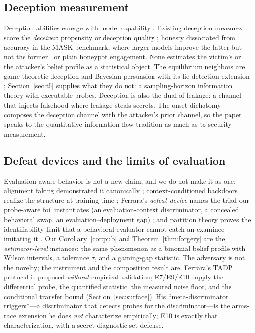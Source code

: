 \subsection{Deception measurement}

Deception abilities emerge with model capability \cite{hagendorff2024}.
Existing deception measures score the \emph{deceiver}: propensity or
deception quality \cite{decepeval,rowe2006}; honesty dissociated from
accuracy in the MASK benchmark, where larger models improve the latter but
not the former \cite{mask2025}; or plain honeypot engagement. None
estimates the victim's or the attacker's belief profile as a statistical
object. The equilibrium neighbors are game-theoretic deception
\cite{nguyen2019} and Bayesian persuasion with its lie-detection extension
\cite{kamenica2011,nberlie}; Section~\ref{sec:t5} supplies what they do not:
a sampling-horizon information theory with executable probes. Deception is
also the dual of leakage: a channel that injects falsehood where leakage
steals secrets. The onset dichotomy composes the deception channel with the
attacker's prior channel, so the paper speaks to the
quantitative-information-flow tradition as much as to security measurement.

\subsection{Defeat devices and the limits of evaluation}

Evaluation-aware behavior is not a new claim, and we do not make it as one:
alignment faking demonstrated it canonically \cite{greenblatt2024faking};
context-conditioned backdoors realize the structure at training time
\cite{liu2025tifs,sleeperagents2024}; Ferrara's \emph{defeat device} names the triad our
probe-aware foil instantiates (an evaluation-context discriminator, a
concealed behavioral swap, an evaluation--deployment gap) \cite{ferrara2026};
and partition theory proves the identifiability limit that a behavioral
evaluator cannot catch an examinee imitating it \cite{mahran2026}. Our
Corollary~\ref{cor:pub} and Theorem~\ref{thm:forgery} are the
\emph{estimator-level} instances: the same phenomenon as a binomial belief
profile with Wilson intervals, a tolerance $\tau$, and a gaming-gap
statistic. The adversary is not the novelty; the instrument and the
composition result are. Ferrara's TADP protocol is proposed \emph{without}
empirical validation; E7/E9/E10 supply the differential probe, the
quantified statistic, the measured noise floor, and the conditional
transfer bound (Section~\ref{sec:surface}). His ``meta-discriminator
triggers''---a discriminator that detects probes for the discriminator---is
the arms-race extension he does \emph{not} characterize empirically; E10
is exactly that characterization, with a secret-diagnostic-set defense.

